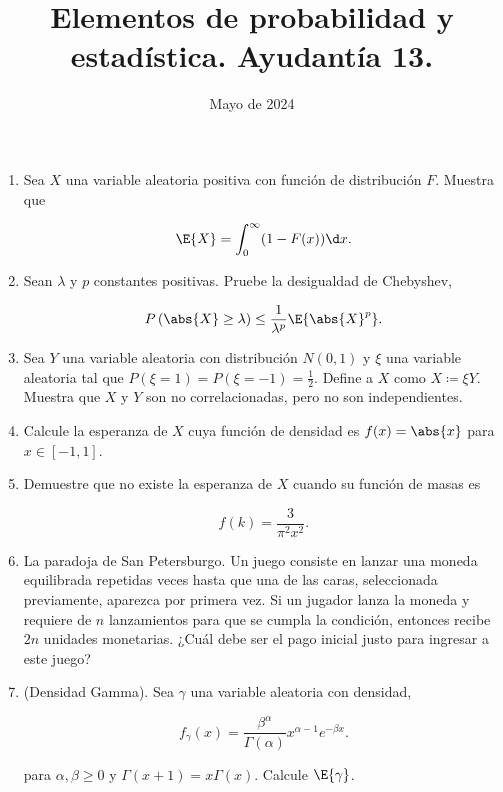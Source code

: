 \documentclass{article}
\title{Elementos de probabilidad y estadística. Ayudantía 13.}
\date{Mayo de 2024}
\renewcommand{\P}[1]{P\left(#1\right)}
\begin{document}
\maketitle 

\begin{enumerate}

    \item Sea $X$ una variable aleatoria positiva con función de distribución $F$. Muestra que
    
    \begin{equation*}
        \E{ X } = \int_0^\infty (1- F(x)) \d x.
    \end{equation*}
    
    \item Sean $\lambda$ y $p$ constantes positivas. Pruebe la desigualdad de Chebyshev,
    
    \begin{equation*}
        \P{\abs{X} \ge \lambda} \le \frac1{\lambda^p} \E{ \abs{X}^p }.
    \end{equation*}

    \item Sea $Y$ una variable aleatoria con distribución $N(0,1)$ y $\xi$ una variable aleatoria tal que $\P{\xi=1} = \P{\xi=-1} = \frac12$. Define a $X$ como $X \coloneqq \xi Y$. Muestra que $X$ y $Y$ son no correlacionadas, pero no son independientes.
    
    \item Calcule la esperanza de $X$ cuya función de densidad es $f(x) = \abs{x}$ para $x \in [-1,1]$.
    
    \item Demuestre que no existe la esperanza de $X$ cuando su función de masas es 
    
    \begin{equation*}
        f(k) = \frac{3}{\pi^2 x^2}.
    \end{equation*}

    \item La paradoja de San Petersburgo. Un juego consiste en lanzar una moneda equilibrada repetidas veces hasta que una de las caras, seleccionada previamente, aparezca por primera vez. Si un jugador lanza la moneda y requiere de $n$ lanzamientos para que se cumpla la condición, entonces recibe $2n$ unidades monetarias. ¿Cuál debe ser el pago inicial justo para ingresar a este juego?
    
    \item (Densidad Gamma). Sea $\gamma$ una variable aleatoria con densidad,
    
    \begin{equation*}
        f_\gamma(x) = \frac{\beta^\alpha}{\Gamma(\alpha)}x^{\alpha-1}e^{-\beta x}.
    \end{equation*}

    \noindent para $\alpha,\beta \ge 0$ y $\Gamma(x+1) = x\Gamma(x)$. Calcule $\E{\gamma}$.

\end{enumerate}
\end{document}
